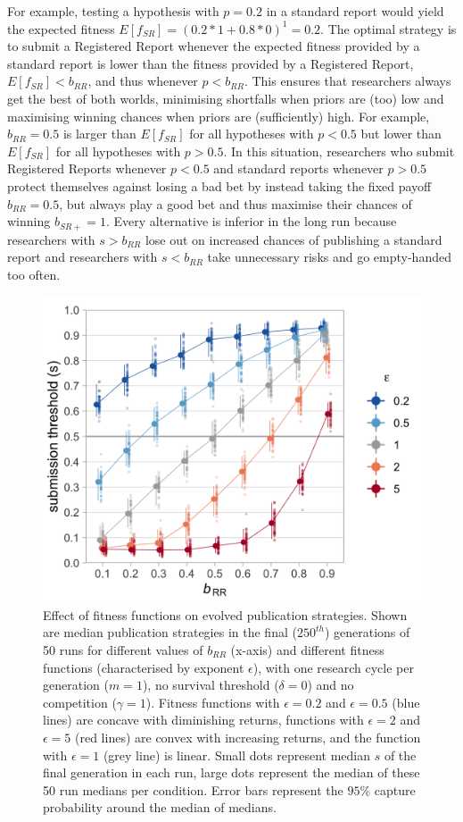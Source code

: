 \documentclass[
  ,man,mask,floatsintext]{apa6}
\begin{document}
For example, testing a hypothesis with \(p = 0.2\) in a standard report would yield the expected fitness \(E[f_{SR}] = (0.2 * 1 + 0.8 * 0)^1 = 0.2\).
The optimal strategy is to submit a Registered Report whenever the expected fitness provided by a standard report is lower than the fitness provided by a Registered Report, \(E[f_{SR}] < b_{RR}\), and thus whenever \(p < b_{RR}\).
This ensures that researchers always get the best of both worlds, minimising shortfalls when priors are (too) low and maximising winning chances when priors are (sufficiently) high.
For example, \(b_{RR} = 0.5\) is larger than \(E[f_{SR}]\) for all hypotheses with \(p < 0.5\) but lower than \(E[f_{SR}]\) for all hypotheses with \(p > 0.5\).
In this situation, researchers who submit Registered Reports whenever \(p<0.5\) and standard reports whenever \(p>0.5\) protect themselves against losing a bad bet by instead taking the fixed payoff \(b_{RR} = 0.5\), but always play a good bet and thus maximise their chances of winning \(b_{SR+} = 1\).
Every alternative is inferior in the long run because researchers with \(s > b_{RR}\) lose out on increased chances of publishing a standard report and researchers with \(s < b_{RR}\) take unnecessary risks and go empty-handed too often.



\begin{figure}

{\centering \includegraphics[width=0.65\linewidth]{plots/plot_b_epsilon} 

}

\caption{Effect of fitness functions on evolved publication strategies. Shown are median publication strategies in the final (\(250^{th}\)) generations of 50 runs for different values of \(b_{RR}\) (x-axis) and different fitness functions (characterised by exponent \(\epsilon\)), with one research cycle per generation (\(m = 1\)), no survival threshold (\(\delta = 0\)) and no competition (\(\gamma = 1\)). Fitness functions with \(\epsilon = 0.2\) and \(\epsilon = 0.5\) (blue lines) are concave with diminishing returns, functions with \(\epsilon = 2\) and \(\epsilon = 5\) (red lines) are convex with increasing returns, and the function with \(\epsilon = 1\) (grey line) is linear. Small dots represent median \(s\) of the final generation in each run, large dots represent the median of these 50 run medians per condition. Error bars represent the \(95\%\) capture probability around the median of medians.}\label{fig:epsilonplot}
\end{figure}
\end{document}
